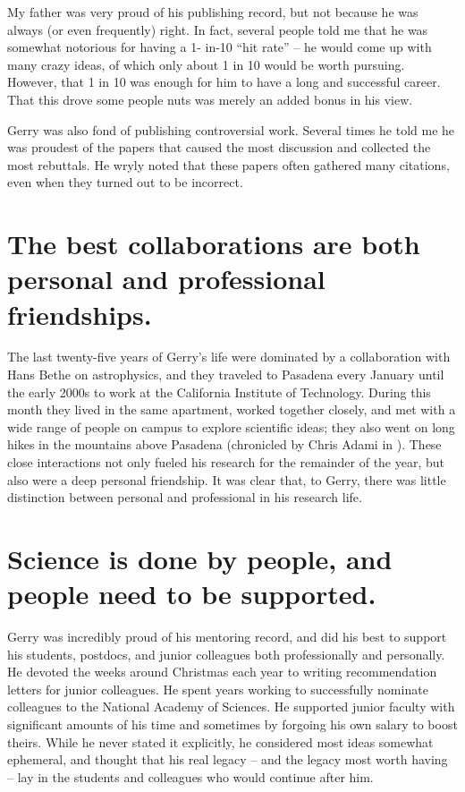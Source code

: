 My father was very proud of his publishing record, but not because he
was always (or even frequently) right. In fact, several people told me
that he was somewhat notorious for having a 1- in-10 ``hit rate'' -- he
would come up with many crazy ideas, of which only about 1 in 10 would
be worth pursuing. However, that 1 in 10 was enough for him to have a
long and successful career.  That this drove some people nuts was
merely an added bonus in his view.

Gerry was also fond of publishing controversial work. Several times he
told me he was proudest of the papers that caused the most discussion
and collected the most rebuttals. He wryly noted that these
papers often gathered many citations, even when they
turned out to be incorrect.

\section*{The best collaborations are both personal and professional
friendships.}

The last twenty-five years of Gerry's life were dominated by a
collaboration with Hans Bethe on astrophysics, and they traveled to
Pasadena every January until the early 2000s to work at the California
Institute of Technology. During this month they lived in the same
apartment, worked together closely, and met with a wide range of
people on campus to explore scientific ideas; they also went on long
hikes in the mountains above Pasadena (chronicled by Chris Adami in
\cite{adami2006three}). These close interactions not only fueled his
research for the remainder of the year, but also were a deep personal
friendship. It was clear that, to Gerry, there was little distinction
between personal and professional in his research life.

\section*{Science is done by people, and people need to be supported.}

Gerry was incredibly proud of his mentoring record, and did his best
to support his students, postdocs, and junior colleagues both
professionally and personally. He devoted the weeks around Christmas
each year to writing recommendation letters for junior colleagues. He
spent years working to successfully nominate colleagues to the
National Academy of Sciences. He supported junior faculty with
significant amounts of his time and sometimes by forgoing his own
salary to boost theirs. While he never stated it explicitly, he
considered most ideas somewhat ephemeral, and thought that his real
legacy -- and the legacy most worth having -- lay in the students and
colleagues who would continue after him.

